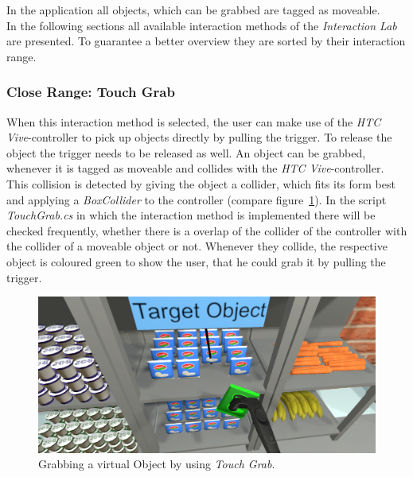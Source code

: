 In the application all objects, which can be grabbed are tagged as moveable.\\

In the following sections all available interaction methods of the \textit{Interaction Lab} are presented. To guarantee a better overview they are sorted by their interaction range. 

\subsubsection{Close Range: Touch Grab} \label{sec:TouchGrab}
When this interaction method is selected, the user can make use of the \textit{HTC Vive}-controller to pick up objects directly by pulling the trigger. To release the object the trigger needs to be released as well. An object can be grabbed, whenever it is tagged as moveable and collides with the \textit{HTC Vive}-controller. This collision is detected by giving the object a collider, which fits its form best \cite{website:BoxCollider}\cite{website:SphereCollider} and applying a \textit{BoxCollider} to the controller (compare figure~\ref{fig:touchGrab}). In the script \textit{TouchGrab.cs} in which the interaction method is implemented there will be checked frequently, whether there is a overlap of the collider of the controller with the collider of a moveable object or not. Whenever they collide, the respective object is coloured green to show the user, that he could grab it by pulling the trigger. 

\begin{figure}[H] 
	\center 
	\includegraphics[width=12cm]{Images/TouchGrab.PNG}			
	\caption[Grabbing a virtual Object by using \textit{Touch Grab}.]{Grabbing a virtual Object by using \textit{Touch Grab}.}
	\label{fig:touchGrab}
\end{figure}

